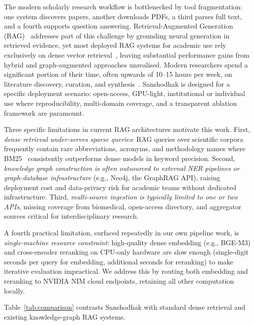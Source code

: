 \documentclass[journal]{IEEEtran}
\begin{document}
The modern scholarly research workflow is bottlenecked by tool
fragmentation: one system discovers papers, another downloads PDFs,
a third parses full text, and a fourth supports question answering.
Retrieval-Augmented Generation (RAG)~\cite{lewis2020rag} addresses
part of this challenge by grounding neural generation in retrieved
evidence, yet most deployed RAG systems for academic use rely
exclusively on dense vector retrieval~\cite{johnson2019faiss}, leaving
substantial performance gains from hybrid and graph-augmented
approaches unrealised. Modern researchers spend a significant portion
of their time, often upwards of 10–15 hours per week, on literature
discovery, curation, and synthesis~\cite{tenopir2015scholarly}.
Sanshodhak is designed for a specific deployment scenario: open-access,
GPU-light, institutional or individual use where reproducibility,
multi-domain coverage, and a transparent ablation framework are
paramount.

Three specific limitations in current RAG architectures motivate this
work. First, \emph{dense retrieval under-serves sparse queries}: RAG
queries over scientific corpora frequently contain rare abbreviations,
acronyms, and methodology names where BM25~\cite{robertson2009probabilistic}
consistently outperforms dense models in keyword precision. Second,
\emph{knowledge graph construction is often outsourced to external NER
pipelines or graph-database infrastructure} (e.g., Neo4j, the GraphRAG
API), raising deployment cost and data-privacy risk for academic teams
without dedicated infrastructure. Third, \emph{multi-source ingestion
is typically limited to one or two APIs}, missing coverage from
biomedical, open-access directory, and aggregator sources critical for
interdisciplinary research.

A fourth practical limitation, surfaced repeatedly in our own pipeline
work, is \emph{single-machine resource constraint}: high-quality dense
embedding (e.g., BGE-M3) and cross-encoder reranking on CPU-only
hardware are slow enough (single-digit seconds per query for
embedding, additional seconds for reranking) to make iterative
evaluation impractical. We address this by routing both embedding and
reranking to NVIDIA NIM cloud endpoints, retaining all other
computation locally.

Table~\ref{tab:comparison} contrasts Sanshodhak with standard dense
retrieval and existing knowledge-graph RAG systems.
\end{document}
